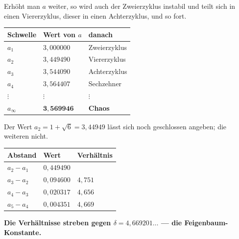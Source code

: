 \begin{merksatz}
Erhöht man $a$ weiter, so wird auch der Zweierzyklus instabil und teilt sich in einen Viererzyklus, dieser in einen Achterzyklus, und so fort.

\begin{center}
{\small
\renewcommand{\arraystretch}{1.48}
\begin{tabular}{@{}P{2.4cm}P{2.4cm}P{2.6cm}@{}}
\toprule
\textbf{Schwelle} & \textbf{Wert von $a$} & \textbf{danach}\\
\midrule
$a_1$ & $3{,}000000$ & Zweierzyklus\\
$a_2$ & $3{,}449490$ & Viererzyklus\\
$a_3$ & $3{,}544090$ & Achterzyklus\\
$a_4$ & $3{,}564407$ & Sechzehner\\
$\vdots$ & $\vdots$ & $\vdots$\\
$a_\infty$ & $\mathbf{3{,}569946}$ & \textcolor{akzent}{\textbf{Chaos}}\\
\bottomrule
\end{tabular}}
\end{center}

Der Wert $a_2 = 1+\sqrt6 = 3{,}44949$ lässt sich noch geschlossen angeben; die weiteren nicht.

\begin{center}
\renewcommand{\arraystretch}{1.45}
\begin{tabular}{@{}P{2.8cm}P{2.2cm}P{2.6cm}@{}}
\toprule
\textbf{Abstand} & \textbf{Wert} & \textbf{Verhältnis}\\
\midrule
$a_2 - a_1$ & $0{,}449490$ & \\
$a_3 - a_2$ & $0{,}094600$ & $4{,}751$\\
$a_4 - a_3$ & $0{,}020317$ & $4{,}656$\\
$a_5 - a_4$ & $0{,}004351$ & $4{,}669$\\
\bottomrule
\end{tabular}
\end{center}

\begin{center}
\begin{minipage}{0.9\textwidth}
\textbf{Die Verhältnisse streben gegen $\delta = 4{,}669201\ldots$ --- die Feigenbaum-Konstante.}
\end{minipage}
\end{center}

\begin{center}
\begin{minipage}{0.88\textwidth}
\end{minipage}
\end{center}
\end{merksatz}

